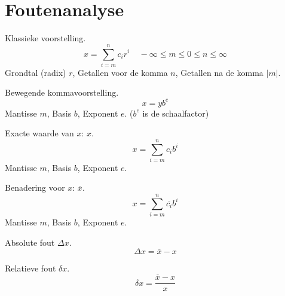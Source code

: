 \documentclass[samenvatting.tex]{subfiles}
\begin{document}
\chapter{Foutenanalyse}
\begin{defi}
Klassieke voorstelling.
\[
x = \sum_{i=m}^nc_{i}r^{i}\ \text{ }\ -\infty \le m \le 0 \le n \le \infty
\]
Grondtal (radix) $r$, Getallen voor de komma $n$, Getallen na de komma $|m|$.
\end{defi}
\begin{defi}
Bewegende kommavoorstelling.
\[
x = yb^e
\]
Mantisse $m$, Basis $b$, Exponent $e$. ($b^e$ is de schaalfactor)
\end{defi}
\begin{defi}
Exacte waarde van $x$: $x$.
\[
x = \sum_{i=m}^nc_{i}b^{i}
\]
Mantisse $m$, Basis $b$, Exponent $e$.
\end{defi}
\begin{defi}
Benadering voor $x$: $\overline{x}$.
\[
x = \sum_{i=m}^n\overline{c_{i}}b^{i}
\]
Mantisse $m$, Basis $b$, Exponent $e$.
\end{defi}
\begin{defi}
Absolute fout $\Delta x$.
\[
\Delta x = \overline{x} - x
\]
\end{defi}
\begin{defi}
Relatieve fout $\delta x$.
\[
\delta x = \frac{\overline{x} - x}{x}
\]
\end{defi}
\end{document}
